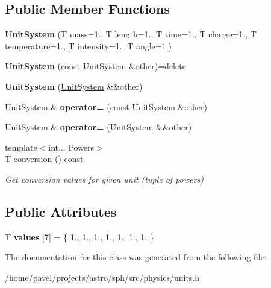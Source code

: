 \subsection*{Public Member Functions}
\begin{DoxyCompactItemize}
\item 
\hypertarget{classUnitSystem_af38c54740573dfb058a49f3fd4769748}{}\label{classUnitSystem_af38c54740573dfb058a49f3fd4769748} 
{\bfseries Unit\+System} (T mass=1., T length=1., T time=1., T charge=1., T temperature=1., T intensity=1., T angle=1.)
\item 
\hypertarget{classUnitSystem_a301e3e53cfab0a0654aed5b1ad8f35fd}{}\label{classUnitSystem_a301e3e53cfab0a0654aed5b1ad8f35fd} 
{\bfseries Unit\+System} (const \hyperlink{classUnitSystem}{Unit\+System} \&other)=delete
\item 
\hypertarget{classUnitSystem_aebf082c2465123dc92c587da87a2b21c}{}\label{classUnitSystem_aebf082c2465123dc92c587da87a2b21c} 
{\bfseries Unit\+System} (\hyperlink{classUnitSystem}{Unit\+System} \&\&other)
\item 
\hypertarget{classUnitSystem_a2565d3a16ffcf5e88367aa86a6049a95}{}\label{classUnitSystem_a2565d3a16ffcf5e88367aa86a6049a95} 
\hyperlink{classUnitSystem}{Unit\+System} \& {\bfseries operator=} (const \hyperlink{classUnitSystem}{Unit\+System} \&other)
\item 
\hypertarget{classUnitSystem_a3369bb6f1b5a5c1034dadb54f06b0515}{}\label{classUnitSystem_a3369bb6f1b5a5c1034dadb54f06b0515} 
\hyperlink{classUnitSystem}{Unit\+System} \& {\bfseries operator=} (\hyperlink{classUnitSystem}{Unit\+System} \&\&other)
\item 
\hypertarget{classUnitSystem_ab4b0d9ab3978149f69f097b0ac2b4466}{}\label{classUnitSystem_ab4b0d9ab3978149f69f097b0ac2b4466} 
{\footnotesize template$<$int... Powers$>$ }\\T \hyperlink{classUnitSystem_ab4b0d9ab3978149f69f097b0ac2b4466}{conversion} () const
\begin{DoxyCompactList}\small\item\em Get conversion values for given unit (tuple of powers) \end{DoxyCompactList}\end{DoxyCompactItemize}
\subsection*{Public Attributes}
\begin{DoxyCompactItemize}
\item 
\hypertarget{classUnitSystem_ac422bde988d7d82f27a1e58e1bca4659}{}\label{classUnitSystem_ac422bde988d7d82f27a1e58e1bca4659} 
T {\bfseries values} \mbox{[}7\mbox{]} = \{ 1., 1., 1., 1., 1., 1., 1. \}
\end{DoxyCompactItemize}


The documentation for this class was generated from the following file\+:\begin{DoxyCompactItemize}
\item 
/home/pavel/projects/astro/sph/src/physics/units.\+h\end{DoxyCompactItemize}
